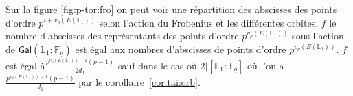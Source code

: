 \documentclass[10pt,a4paper]{book}
\theoremstyle{plain}
\theoremstyle{definition}
\theoremstyle{definition}
\theoremstyle{definition}
\theoremstyle{definition}
\theoremstyle{definition}
\theoremstyle{remark}
\theoremstyle{remark}
\theoremstyle{definition}
\begin{document}
Sur la figure \ref{fig:p-tor:fro} on peut voir une répartition des abscisses des points d'ordre $p^{i+v_p(E(\mathbb{L}_1))}$ selon l'action du Frobenius et les différentes orbites. $f$ le nombre d'abscisses des représentants des points d'ordre $p^{v_p(E(\mathbb{L}_1))}$ sous l'action de $\mathsf{Gal}(\mathbb{L}_1:\mathbb{F}_q)$ est égal aux nombres d'abscisses de points d'ordre $p^{v_p(E(\mathbb{L}_1))}$. $f$ est égal à$ \frac{p^{v_p(E(\mathbb{L}_1))-1}(p-1)}{2 d_1}$ sauf dans le cas où $2 | [\mathbb{L}_1:\mathbb{F}_q]$ où l'on a $\frac{p^{v_p(E(\mathbb{L}_1))-1}(p-1)}{d_1}$ par le corollaire~\ref{cor:tai:orb}.

\begin{figure}
\begin{center}
\end{center}
\end{figure}
\end{document}
